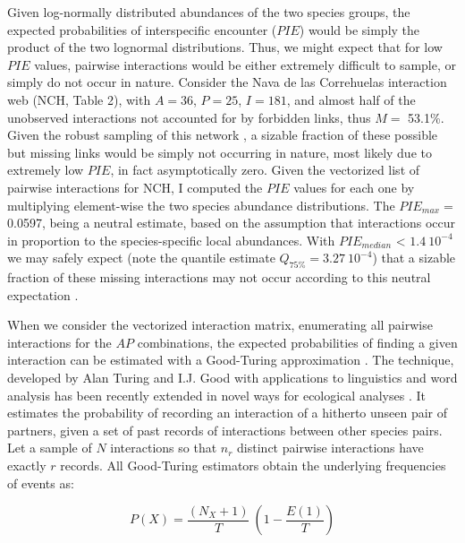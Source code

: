\documentclass[12pt]{article}
\begin{document}
Given log-normally distributed abundances of the two species groups, the expected probabilities of interspecific encounter ($PIE$) would be simply the product of the two lognormal distributions. Thus, we might expect that for low $PIE$ values, pairwise interactions would be either extremely difficult to sample, or simply do not occur in nature. Consider the Nava de las Correhuelas interaction web (NCH, Table 2), with $A= 36$, $P= 25$, $I= 181$, and almost half of the unobserved interactions not accounted for by forbidden links, thus $M=$ 53.1\%. Given the robust sampling of this network \citep{Jordano:2009c}, a sizable fraction of these possible but missing links would be simply not occurring in nature, most likely due to extremely low $PIE$, in fact asymptotically zero. Given the vectorized list of pairwise interactions for NCH, I computed the $PIE$ values for each one by multiplying element-wise the two species abundance distributions. The ${PIE}_{max}=$ 0.0597, being a neutral estimate, based on the assumption that interactions occur in proportion to the species-specific local abundances. With $PIE_{median}$ < $1.4\ 10^{-4}$ we may safely expect (note the quantile estimate $Q_{75\%}= $$3.27\ 10^{-4}$) that a sizable fraction of these missing interactions may  not occur according to this neutral expectation \citep{E31/2562,Olesen:2011a} \citep[neutral forbidden links, \emph{sensu}][]{Canard:2012jy}.  

When we consider the vectorized interaction matrix, enumerating all pairwise interactions for the $AP$ combinations, the expected probabilities of finding a given interaction can be estimated with a Good-Turing approximation \citep{Good:1953tn}. The technique, developed by Alan Turing and I.J. Good with applications to linguistics and word analysis \citep{Gale:1995uy} has been recently extended in novel ways for ecological analyses \citep{Chao:2015tc}. It estimates the probability of recording an interaction of a hitherto unseen pair of partners, given a set of past records of interactions between other species pairs. Let a sample of $N$ interactions so that $n_r$ distinct pairwise interactions have exactly $r$ records. All Good-Turing estimators obtain the underlying frequencies of events as:

\begin{equation}
P(X)= \frac{(N_X + 1)}{T}\ (1-\frac{E(1)}{T})
\end{equation}
\end{document}

